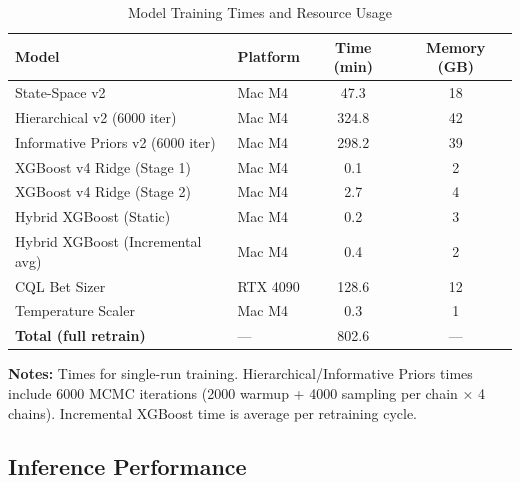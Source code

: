 \begin{table}[htbp]
\centering
\caption{Model Training Times and Resource Usage}
\label{tab:training-times}
\small
\begin{tabular}{@{} l l S[table-format=5.1] S[table-format=3.0] @{}}
\toprule
\textbf{Model} & \textbf{Platform} & \textbf{Time (min)} & \textbf{Memory (GB)} \\
\midrule
State-Space v2 & Mac M4 & 47.3 & 18 \\
Hierarchical v2 (6000 iter) & Mac M4 & 324.8 & 42 \\
Informative Priors v2 (6000 iter) & Mac M4 & 298.2 & 39 \\
XGBoost v4 Ridge (Stage 1) & Mac M4 & 0.1 & 2 \\
XGBoost v4 Ridge (Stage 2) & Mac M4 & 2.7 & 4 \\
Hybrid XGBoost (Static) & Mac M4 & 0.2 & 3 \\
Hybrid XGBoost (Incremental avg) & Mac M4 & 0.4 & 2 \\
CQL Bet Sizer & RTX 4090 & 128.6 & 12 \\
Temperature Scaler & Mac M4 & 0.3 & 1 \\
\baselinerule
\textbf{Total (full retrain)} & {---} & 802.6 & {---} \\
\bottomrule
\end{tabular}

\vspace{2mm}
\begin{minipage}{\linewidth}
\small
\textbf{Notes:} Times for single-run training. Hierarchical/Informative Priors times include 6000 MCMC iterations (2000 warmup + 4000 sampling per chain × 4 chains). Incremental XGBoost time is average per retraining cycle.
\end{minipage}
\end{table}

\subsection{Inference Performance}

